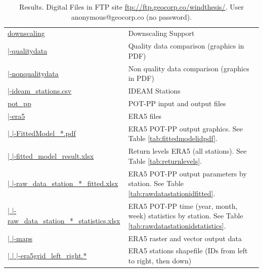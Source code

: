 \documentclass[12pt,oneside]{reedthesis}
\begin{document}
\begingroup\fontsize{8}{10}\selectfont
\begin{longtable}[t]{>{\raggedright\arraybackslash}p{2.2in}>{\raggedright\arraybackslash}p{4in}}
\caption[Results. Digital Files]{\label{tab:resultsstructure}Results. Digital Files in FTP site \href{ftp://ftp.geocorp.co/windthesis/}{ftp://ftp.geocorp.co/windthesis/}. User anonymous@geocorp.co (no password).}\\
\toprule
\multicolumn{1}{l}{Folder Tree - Ftp Links} & \multicolumn{1}{l}{Description}\\
\midrule
\href{ftp://ftp.geocorp.co/windthesis/downscaling/}{downscaling} & Downscaling Support\\
\href{ftp://ftp.geocorp.co/windthesis/downscaling/qualitydata/}{  |-qualitydata} & Quality data comparison (graphics in PDF)\\
\href{ftp://ftp.geocorp.co/windthesis/downscaling/nonqualitydata/}{  |-nonqualitydata} & Non quality data comparison (graphics in PDF)\\
\href{ftp://ftp.geocorp.co/windthesis/downscaling/ideam_stations.csv}{  |-ideam\_stations.csv} & IDEAM Stations\\
\href{ftp://ftp.geocorp.co/windthesis/potpp/}{pot\_pp} & POT-PP input and output files\\
\href{ftp://ftp.geocorp.co/windthesis/potpp/era5/}{  |-era5} & ERA5 files\\
\href{ftp://ftp.geocorp.co/windthesis/potpp/era5/}{  |    |-FittedModel\_*.pdf} & ERA5 POT-PP output graphics. See Table \ref{tab:fittedmodelidpdf}.\\
\href{ftp://ftp.geocorp.co/windthesis/potpp/era5/fitted_model_result_PoissonProcessGumbelIntFunc.xlsx}{  |    |-fitted\_model\_result.xlsx} & Return levels ERA5 (all stations). See Table \ref{tab:returnlevels}.\\
\href{ftp://ftp.geocorp.co/windthesis/potpp/era5/}{  |    |-raw\_data\_station\_*\_fitted.xlsx} & ERA5 POT-PP output parameters by station. See Table \ref{tab:rawdatastationidfitted}.\\
\href{ftp://ftp.geocorp.co/windthesis/potpp/era5/}{  |    |-raw\_data\_station\_*\_statistics.xlsx} & ERA5 POT-PP time (year, month, week) statistics by station. See Table \ref{tab:rawdatastationidstatistics}.\\
\href{ftp://ftp.geocorp.co/windthesis/potpp/era5/maps/}{  |    |-maps} & ERA5 raster and vector output data\\
\href{ftp://ftp.geocorp.co/windthesis/potpp/era5/maps/}{  |    |    |-era5grid\_left\_right.*} & ERA5 stations shapefile (IDs from left to right, then down)\\

\end{longtable}
\end{document}
